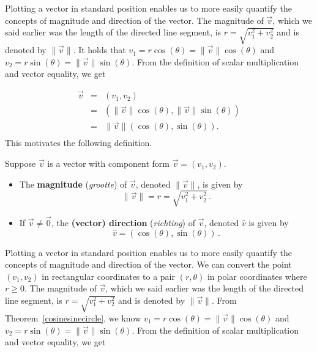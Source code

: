 \ifvc
Plotting a vector in standard position enables us to more easily quantify the concepts of magnitude and direction of the vector. The magnitude of $\vec{v}$, which we said earlier was the length of the directed line segment, is $r = \sqrt{v_1^2 + v_2^2}$ and is denoted by $\| \vec{v} \|$. It holds that $v_1 = r \cos(\theta) = \| \vec{v} \| \cos(\theta)$ and $v_2  = r \sin(\theta) = \| \vec{v} \| \sin(\theta)$. From the definition of scalar multiplication and vector equality, we get

\[ \begin{array}{rcl} \vec{v} & = & \left( v_1 , v_2  \right) \\ [3pt]
& = & \left( \| \vec{v} \| \cos(\theta), \| \vec{v} \| \sin(\theta) \right) \\ [3pt]
& = &  \| \vec{v} \| \left( \cos(\theta),\sin(\theta) \right). \\ \end{array} \]
This motivates the following definition.

\begin{definition} \label{polarformvector} 
	Suppose $\vec{v}$ is a vector with component form $\vec{v} =\left( v_1 , v_2  \right)$. 
	\begin{itemize}
		
		\item  The \textbf{magnitude} (\textit{grootte})   of $\vec{v}$, denoted $\| \vec{v} \|$, is given by 
		$$\| \vec{v} \| = r =   \sqrt{v_1^2 + v_2^2}\,.$$
		
		\item If $\vec{v} \neq \vec{0}$,  the \textbf{(vector) direction} (\textit{richting})   of $\vec{v}$, denoted $\hat{v}$ is given by  
		$$\hat{v} = \left( \cos(\theta), \sin(\theta) \right)\,.$$
		
	\end{itemize}
	
\end{definition}

\fi

\ifcourse
Plotting a vector in standard position enables us to more easily quantify the concepts of magnitude and direction of the vector. We can convert the point $\left(v_1,v_2\right)$ in rectangular coordinates to a pair $(r,\theta)$ in polar coordinates where $r \geq 0$.  The magnitude of $\vec{v}$, which we said earlier was the length of the directed line segment, is $r = \sqrt{v_1^2 + v_2^2}$ and is denoted by $\| \vec{v} \|$.  From Theorem~\ref{cosinesinecircle}, we know $v_1 = r \cos(\theta) = \| \vec{v} \| \cos(\theta)$ and $v_2  = r \sin(\theta) = \| \vec{v} \| \sin(\theta)$. From the definition of scalar multiplication and vector equality, we get

